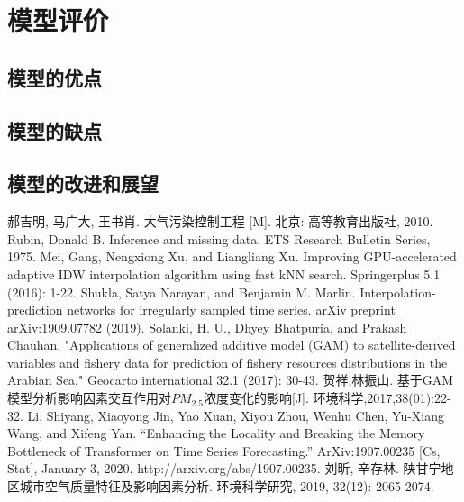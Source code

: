 \documentclass[a4paper,10pt]{my_paper}
\numberwithin{equation}{section}
\begin{document}
\section{模型评价}

\subsection{模型的优点}

\subsection{模型的缺点}

\subsection{模型的改进和展望}

\begin{thebibliography}{10}
郝吉明, 马广大, 王书肖. 大气污染控制工程 [M]. 北京: 高等教育出版社, 2010.
Rubin, Donald B. Inference and missing data. ETS Research Bulletin Series, 1975.
Mei, Gang, Nengxiong Xu, and Liangliang Xu. Improving GPU-accelerated adaptive IDW interpolation algorithm using fast kNN search. Springerplus 5.1 (2016): 1-22.
Shukla, Satya Narayan, and Benjamin M. Marlin. Interpolation-prediction networks for irregularly sampled time series. arXiv preprint arXiv:1909.07782 (2019).
Solanki, H. U., Dhyey Bhatpuria, and Prakash Chauhan. "Applications of generalized additive model (GAM) to satellite-derived variables and fishery data for prediction of fishery resources distributions in the Arabian Sea." Geocarto international 32.1 (2017): 30-43.
贺祥,林振山. 基于GAM模型分析影响因素交互作用对${PM_{2.5}}$浓度变化的影响[J]. 环境科学,2017,38(01):22-32.
Li, Shiyang, Xiaoyong Jin, Yao Xuan, Xiyou Zhou, Wenhu Chen, Yu-Xiang Wang, and Xifeng Yan. “Enhancing the Locality and Breaking the Memory Bottleneck of Transformer on Time Series Forecasting.” ArXiv:1907.00235 [Cs, Stat], January 3, 2020. http://arxiv.org/abs/1907.00235.
刘昕, 辛存林. 陕甘宁地区城市空气质量特征及影响因素分析. 环境科学研究, 2019, 32(12): 2065-2074.

\end{thebibliography}
\end{document}
